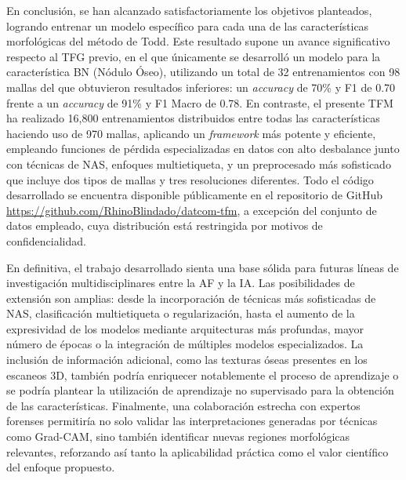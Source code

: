En conclusión, se han alcanzado satisfactoriamente los objetivos planteados, logrando entrenar un modelo específico para cada una de las características morfológicas del método de Todd. Este resultado supone un avance significativo respecto al TFG previo, en el que únicamente se desarrolló un modelo para la característica BN (Nódulo Óseo), utilizando un total de 32 entrenamientos con 98 mallas del que obtuvieron resultados inferiores: un \textit{accuracy} de 70\% y F1 de 0.70 frente a un \textit{accuracy} de 91\% y F1 Macro de 0.78. En contraste, el presente TFM ha realizado 16,800 entrenamientos distribuidos entre todas las características haciendo uso de 970 mallas, aplicando un \textit{framework} más potente y eficiente, empleando funciones de pérdida especializadas en datos con alto desbalance junto con técnicas de NAS, enfoques multietiqueta, y un preprocesado más sofisticado que incluye dos tipos de mallas y tres resoluciones diferentes. Todo el código desarrollado se encuentra disponible públicamente en el repositorio de GitHub \url{https://github.com/RhinoBlindado/datcom-tfm}, a excepción del conjunto de datos empleado, cuya distribución está restringida por motivos de confidencialidad.

En definitiva, el trabajo desarrollado sienta una base sólida para futuras líneas de investigación multidisciplinares entre la AF y la IA. Las posibilidades de extensión son amplias: desde la incorporación de técnicas más sofisticadas de NAS, clasificación multietiqueta o regularización, hasta el aumento de la expresividad de los modelos mediante arquitecturas más profundas, mayor número de épocas o la integración de múltiples modelos especializados. La inclusión de información adicional, como las texturas óseas presentes en los escaneos 3D, también podría enriquecer notablemente el proceso de aprendizaje o se podría plantear la utilización de aprendizaje no supervisado para la obtención de las características. Finalmente, una colaboración estrecha con expertos forenses permitiría no solo validar las interpretaciones generadas por técnicas como Grad-CAM, sino también identificar nuevas regiones morfológicas relevantes, reforzando así tanto la aplicabilidad práctica como el valor científico del enfoque propuesto.